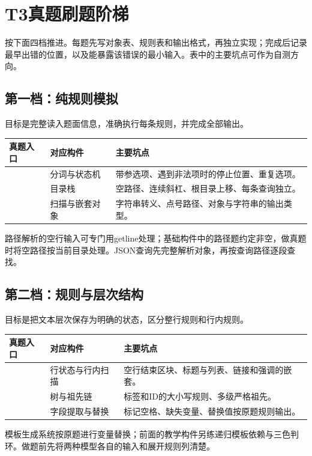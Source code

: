 \section{T3真题刷题阶梯}
按下面四档推进。每题先写对象表、规则表和输出格式，再独立实现；完成后记录最早出错的位置，以及能暴露该错误的最小输入。表中的主要坑点可作为自测方向。

\subsection{第一档：纯规则模拟}
目标是完整读入题面信息，准确执行每条规则，并完成全部输出。
\begin{longtable}{P{5.8cm}P{3cm}P{4.9cm}}
\toprule 真题入口 & 对应构件 & 主要坑点\\\midrule\endhead
{} & 分词与状态机 & 带参选项、遇到非法项时的停止位置、重复选项。\\
 & 目录栈 & 空路径、连续斜杠、根目录上移、每条查询独立。\\
 & 扫描与嵌套对象 & 字符串转义、点号路径、对象与字符串的输出类型。\\
\bottomrule\end{longtable}
路径解析的空行输入可专门用getline处理；基础构件中的路径题约定非空，做真题时将空路径按当前目录处理。JSON查询先完整解析对象，再按查询路径逐段查找。

\subsection{第二档：规则与层次结构}
目标是把文本层次保存为明确的状态，区分整行规则和行内规则。
\begin{longtable}{P{5.8cm}P{3cm}P{4.9cm}}
\toprule 真题入口 & 对应构件 & 主要坑点\\\midrule\endhead
{} & 行状态与行内扫描 & 空行结束区块、标题与列表、链接和强调的嵌套。\\
 & 树与祖先链 & 标签和ID的大小写规则、多级严格祖先。\\
 & 字段提取与替换 & 标记空格、缺失变量、替换值按原题规则输出。\\
\bottomrule\end{longtable}
模板生成系统按原题进行变量替换；前面的教学构件另练递归模板依赖与三色判环。做题前先将两种模型各自的输入和展开规则列清楚。

